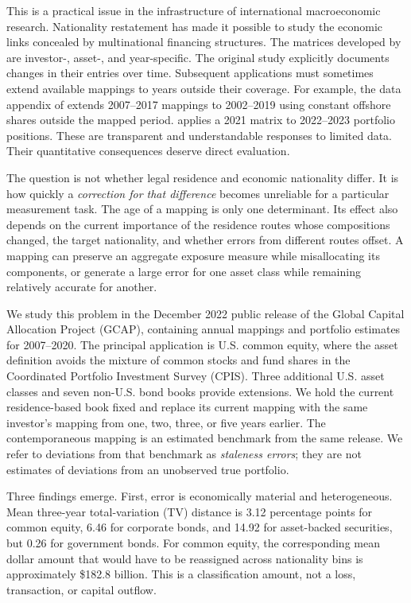 \documentclass[11pt,a4paper]{article}
\begin{document}
This is a practical issue in the infrastructure of international macroeconomic research. Nationality restatement has made it possible to study the economic links concealed by multinational financing structures. The matrices developed by \citet{cmns} are investor-, asset-, and year-specific. The original study explicitly documents changes in their entries over time. Subsequent applications must sometimes extend available mappings to years outside their coverage. For example, the data appendix of \citet{dollar} extends 2007--2017 mappings to 2002--2019 using constant offshore shares outside the mapped period. \citet[Annex 3.1, p.~89]{esm} applies a 2021 matrix to 2022--2023 portfolio positions. These are transparent and understandable responses to limited data. Their quantitative consequences deserve direct evaluation.

The question is not whether legal residence and economic nationality differ. It is how quickly a \emph{correction for that difference} becomes unreliable for a particular measurement task. The age of a mapping is only one determinant. Its effect also depends on the current importance of the residence routes whose compositions changed, the target nationality, and whether errors from different routes offset. A mapping can preserve an aggregate exposure measure while misallocating its components, or generate a large error for one asset class while remaining relatively accurate for another.

We study this problem in the December 2022 public release of the Global Capital Allocation Project (GCAP), containing annual mappings and portfolio estimates for 2007--2020. The principal application is U.S. common equity, where the asset definition avoids the mixture of common stocks and fund shares in the Coordinated Portfolio Investment Survey (CPIS). Three additional U.S. asset classes and seven non-U.S. bond books provide extensions. We hold the current residence-based book fixed and replace its current mapping with the same investor's mapping from one, two, three, or five years earlier. The contemporaneous mapping is an estimated benchmark from the same release. We refer to deviations from that benchmark as \emph{staleness errors}; they are not estimates of deviations from an unobserved true portfolio.

Three findings emerge. First, error is economically material and heterogeneous. Mean three-year total-variation (TV) distance is 3.12 percentage points for common equity, 6.46 for corporate bonds, and 14.92 for asset-backed securities, but 0.26 for government bonds. For common equity, the corresponding mean dollar amount that would have to be reassigned across nationality bins is approximately \$182.8 billion. This is a classification amount, not a loss, transaction, or capital outflow.
\end{document}
